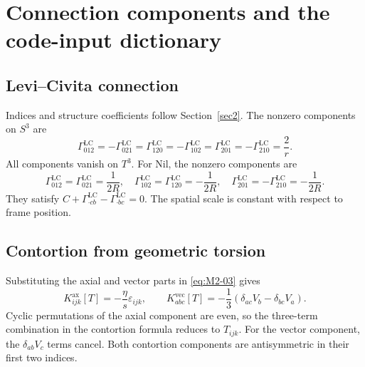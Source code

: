 \section{Connection components and the code-input dictionary}\label{appA}
\subsection{Levi--Civita connection}
Indices and structure coefficients follow Section~\ref{sec2}.
The nonzero components on $S^3$ are
\begin{equation}
\Gamma^{\mathrm{LC}}_{012}=-\Gamma^{\mathrm{LC}}_{021}
=\Gamma^{\mathrm{LC}}_{120}=-\Gamma^{\mathrm{LC}}_{102}
=\Gamma^{\mathrm{LC}}_{201}=-\Gamma^{\mathrm{LC}}_{210}
=\frac2r.
\tag{A-01}\label{eq:A-01}
\end{equation}
All components vanish on $T^3$. For Nil, the nonzero components are
\begin{equation}
\Gamma^{\mathrm{LC}}_{012}=\Gamma^{\mathrm{LC}}_{021}=\frac1{2R},
\quad
\Gamma^{\mathrm{LC}}_{102}=\Gamma^{\mathrm{LC}}_{120}=-\frac1{2R},
\quad
\Gamma^{\mathrm{LC}}_{201}=-\Gamma^{\mathrm{LC}}_{210}=-\frac1{2R}.
\tag{A-02}\label{eq:A-02}
\end{equation}
They satisfy
$C+\Gamma^{\mathrm{LC}}_{\cdot cb}-\Gamma^{\mathrm{LC}}_{\cdot bc}=0$.
The spatial scale is constant with respect to frame position.

\subsection{Contortion from geometric torsion}
Substituting the axial and vector parts in \eqref{eq:M2-03} gives
\begin{equation}
K^{\mathrm{ax}}_{ijk}[T]=-\frac{\eta}{s}\varepsilon_{ijk},
\qquad
K^{\mathrm{vec}}_{abc}[T]
=-\frac13(\delta_{ac}V_b-\delta_{bc}V_a).
\tag{A-03}\label{eq:A-03}
\end{equation}
Cyclic permutations of the axial component are even, so the three-term
combination in the contortion formula reduces to $T_{ijk}$.
For the vector component, the $\delta_{ab}V_c$ terms cancel.
Both contortion components are antisymmetric in their first two indices.

